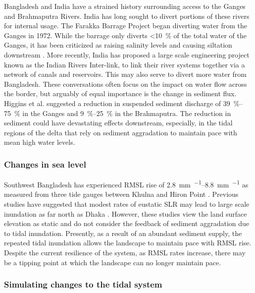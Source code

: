 \documentclass[12pt]{article}
\begin{document}
Bangladesh and India have a strained history surrounding access to the Ganges and Brahmaputra Rivers. India has long sought to divert portions of these rivers for internal usage. The Farakka Barrage Project began diverting water from the Ganges in 1972. While the barrage only diverts \SI{<10}{\percent} of the total water of the Ganges, it has been criticized as raising salinity levels and causing siltation downstream \cite{gainImpactFarakkaDam2014}. More recently, India has proposed a large scale engineering project known as the Indian Rivers Inter-link, to link their river systems together via a network of canals and reservoirs. This may also serve to divert more water from Bangladesh. These conversations often focus on the impact on water flow across the border, but arguably of equal importance is the change in sediment flux. Higgins et al. \cite{higginsRiverLinkingIndia2018}  suggested a reduction in suspended sediment discharge of \SIrange{39}{75}{\percent} in the Ganges and \SIrange{9}{25}{\percent} in the Brahmaputra. The reduction in sediment could have devastating effects downstream, especially, in the tidal regions of the delta that rely on sediment aggradation to maintain pace with mean high water levels.

\subsubsection*{Changes in sea level}

Southwest Bangladesh has experienced RMSL rise of \SIrange{2.8}{8.8}{\milli\meter\per\year} as measured from three tide gauges between Khulna and Hiron Point \cite{pethickRapidRiseEffective2013}. Previous studies have suggested that modest rates of eustatic SLR may lead to large scale inundation as far north as Dhaka \cite{huqSeaLevelRiseBangladesh1995,aliVulnerabilityBangladeshClimate1996,sarwarImpactsSeaLevel2005}. However, these studies view the land surface elevation as static and do not consider the feedback of sediment aggradation due to tidal inundation. Presently, as a result of an abundant sediment supply, the repeated tidal inundation allows the landscape to maintain pace with RMSL rise. Despite the current resilience of the system, as RMSL rates increase, there may be a tipping point at which the landscape can no longer maintain pace.

\subsubsection*{Simulating changes to the tidal system}
\end{document}
